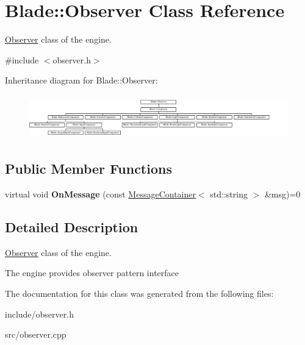 \hypertarget{class_blade_1_1_observer}{}\section{Blade\+:\+:Observer Class Reference}
\label{class_blade_1_1_observer}


\hyperlink{class_blade_1_1_observer}{Observer} class of the engine.  




{\ttfamily \#include $<$observer.\+h$>$}

Inheritance diagram for Blade\+:\+:Observer\+:\begin{figure}[H]
\begin{center}
\leavevmode
\includegraphics[height=1.913875cm]{class_blade_1_1_observer}
\end{center}
\end{figure}
\subsection*{Public Member Functions}
\begin{DoxyCompactItemize}
\item 
\mbox{\label{class_blade_1_1_observer_acbb85f46b9cd5c60e4c7b8ebb7dc4faa}} 
virtual void {\bfseries On\+Message} (const \hyperlink{class_blade_1_1_ref_counted_container}{Message\+Container}$<$ std\+::string $>$ \&msg)=0
\end{DoxyCompactItemize}


\subsection{Detailed Description}
\hyperlink{class_blade_1_1_observer}{Observer} class of the engine. 

The engine provides observer pattern interface 

The documentation for this class was generated from the following files\+:\begin{DoxyCompactItemize}
\item 
include/observer.\+h\item 
src/observer.\+cpp\end{DoxyCompactItemize}
